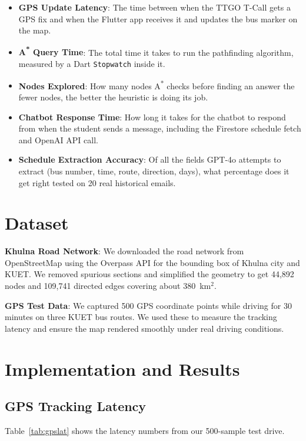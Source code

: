 \documentclass[12pt,a4paper]{report}
\begin{document}
\begin{itemize}[leftmargin=*]
  \item \textbf{GPS Update Latency}: The time between when the TTGO T-Call gets a GPS fix and when the Flutter app receives it and updates the bus marker on the map.
  \item \textbf{A\textsuperscript{*} Query Time}: The total time it takes to run the pathfinding algorithm, measured by a Dart \texttt{Stopwatch} inside it.
  \item \textbf{Nodes Explored}: How many nodes A\textsuperscript{*} checks before finding an answer the fewer nodes, the better the heuristic is doing its job.
  \item \textbf{Chatbot Response Time}: How long it takes for the chatbot to respond from when the student sends a message, including the Firestore schedule fetch and OpenAI API call.
  \item \textbf{Schedule Extraction Accuracy}: Of all the fields GPT-4o attempts to extract (bus number, time, route, direction, days), what percentage does it get right tested on 20 real historical emails.
\end{itemize}

\section{Dataset}

\textbf{Khulna Road Network}: We downloaded the road network from OpenStreetMap using the Overpass API for the bounding box of Khulna city and KUET. We removed spurious sections and simplified the geometry to get 44,892 nodes and 109,741 directed edges covering about 380~km$^2$.


\textbf{GPS Test Data}: We captured 500 GPS coordinate points while driving for 30 minutes on three KUET bus routes. We used these to measure the tracking latency and ensure the map rendered smoothly under real driving conditions.

\section{Implementation and Results}

\subsection{GPS Tracking Latency}

Table~\ref{tab:gpslat} shows the latency numbers from our 500-sample test drive.
\end{document}
